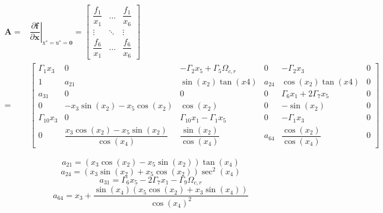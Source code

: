 \documentclass[3p]{elsarticle}
\begin{document}
\begin{align}
    \mathbf{A} =& \left.\dfrac{\partial \mathbf{f}}{\partial \mathbf{x}}\right|_{\boldsymbol{{\mathrm{x}}}^*= \boldsymbol{{\mathrm{u}}}^*=\boldsymbol{0}} = \begin{bmatrix}
        \dfrac{f_1}{x_1} & \dots & \dfrac{f_1}{x_6} \\
        \vdots & \ddots & \vdots \\
        \dfrac{f_6}{x_1} & \dots & \dfrac{f_6}{x_6}
    \end{bmatrix} \\ =&\begin{bmatrix}
        \Gamma_1 x_3 & 0 & -\Gamma_2 x_5  + \Gamma_5 \Omega_{c, r} & 0 &  - \Gamma_2 x_3 & 0 \\
        1 & a_{21} & \sin(x_2)\tan(x4) & a_{24} & \cos(x_2)\tan(x4) & 0 \\
        a_{31} & 0 & 0 & 0 & \Gamma_6 x_1 + 2\Gamma_7 x_5 & 0 \\
        0 & -x_3\sin(x_2) - x_5\cos(x_2)  & \cos(x_2) & 0 & -\sin(x_2) & 0 \\
        \Gamma_{10} x_3 & 0 & \Gamma_{10} x_1 - \Gamma_1 x_5 & 0 & -\Gamma_1 x_3 & 0 \\
        0 & \dfrac{x_3\cos(x_2)-x_5\sin(x_2)}{\cos(x_4)} & \dfrac{\sin(x_2)}{\cos(x_4)} & a_{64} & \dfrac{\cos(x_2)}{\cos(x_4)} & 0
    \end{bmatrix}
\end{align}

$$
a_{21} = (x_3\cos(x_2)-x_5\sin(x_2))\tan(x_4)
$$
$$
a_{24} = (x_3\sin(x_2)+x_5\cos(x_2))\sec^2(x_4)
$$
$$
a_{31} = \Gamma_6 x_5 - 2\Gamma_7 x_1 - \Gamma_9\Omega_{c, r}
$$
$$
a_{64} = x_3 + \dfrac{\sin(x_4)(x_5\cos(x_2) + x_3\sin(x_4))}{\cos(x_4)^2}
$$
\end{document}
